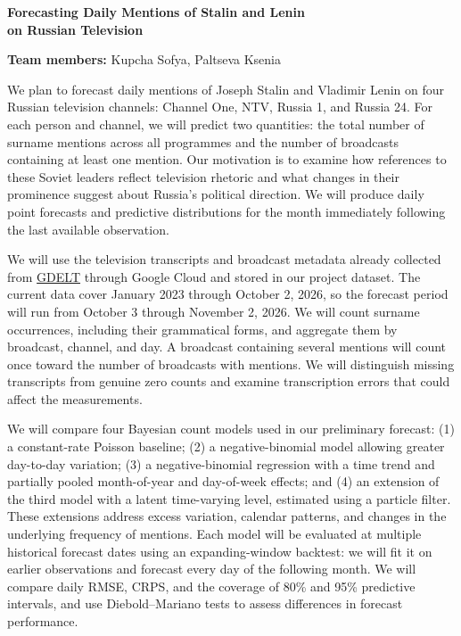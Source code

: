 \documentclass[11pt,a4paper]{article}
\begin{document}
\begin{center}
{\large\bfseries Forecasting Daily Mentions of Stalin and Lenin\\[0.15em]
on Russian Television}

\vspace{0.5em}
\textbf{Team members:} Kupcha Sofya, Paltseva Ksenia
\end{center}

We plan to forecast daily mentions of Joseph Stalin and Vladimir Lenin on four Russian television channels: Channel One, NTV, Russia 1, and Russia 24. For each person and channel, we will predict two quantities: the total number of surname mentions across all programmes and the number of broadcasts containing at least one mention. Our motivation is to examine how references to these Soviet leaders reflect television rhetoric and what changes in their prominence suggest about Russia's political direction. We will produce daily point forecasts and predictive distributions for the month immediately following the last available observation.

We will use the television transcripts and broadcast metadata already collected from \href{https://gdeltproject.org/}{GDELT} through Google Cloud and stored in our project dataset. The current data cover January 2023 through October 2, 2026, so the forecast period will run from October 3 through November 2, 2026. We will count surname occurrences, including their grammatical forms, and aggregate them by broadcast, channel, and day. A broadcast containing several mentions will count once toward the number of broadcasts with mentions. We will distinguish missing transcripts from genuine zero counts and examine transcription errors that could affect the measurements.

We will compare four Bayesian count models used in our preliminary forecast: (1) a constant-rate Poisson baseline; (2) a negative-binomial model allowing greater day-to-day variation; (3) a negative-binomial regression with a time trend and partially pooled month-of-year and day-of-week effects; and (4) an extension of the third model with a latent time-varying level, estimated using a particle filter. These extensions address excess variation, calendar patterns, and changes in the underlying frequency of mentions. Each model will be evaluated at multiple historical forecast dates using an expanding-window backtest: we will fit it on earlier observations and forecast every day of the following month. We will compare daily RMSE, CRPS, and the coverage of 80\% and 95\% predictive intervals, and use Diebold--Mariano tests to assess differences in forecast performance.
\end{document}
